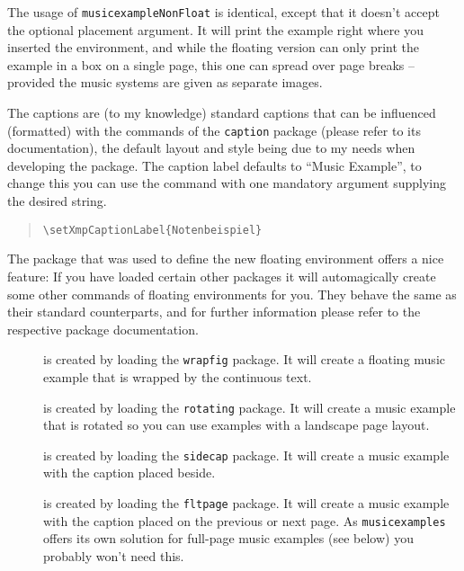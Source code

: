 \documentclass[../openLilyLib]{subfiles}
\begin{document}
The usage of \texttt{musicexampleNonFloat} is identical, except that it doesn't accept the optional placement argument.
It will print the example right where you inserted the environment, and while the floating version can only print the example in a box on a single page, this one can spread over page breaks -- provided the music systems are given as separate images.

The captions are (to my knowledge) standard captions that can be influenced (formatted) with the commands of the \texttt{caption} package (please refer to its documentation), the default layout and style being due to my needs when developing the package.
The caption label defaults to “Music Example”, to change this you can use the command  with one mandatory argument supplying the desired string.
\begin{quote}
\begin{verbatim}
\setXmpCaptionLabel{Notenbeispiel}
\end{verbatim}
\end{quote}

The  package that was used to define the new floating environment offers a nice feature:
If you have loaded certain other packages it will automagically create some other commands of floating environments for you.
They behave the same as their standard counterparts, and for further information please refer to the respective package documentation.

\begin{description}
\item[] is created by loading the \texttt{wrapfig} package.
It will create a floating music example that is wrapped by the continuous text.
\item[] is created by loading the \texttt{rotating} package.
It will create a music example that is rotated so you can use examples with a landscape page layout.
\item[] is created by loading the \texttt{sidecap} package.
It will create a music example with the caption placed beside.
\item[{}] is created by loading the \texttt{fltpage} package.
It will create a music example with the caption placed on the previous or next page.
As \texttt{musicexamples} offers its own solution for full-page music examples (see below) you probably won't need this.
\end{description}
\end{document}
